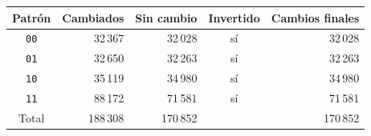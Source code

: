\begin{tabular}{crrcr}
\toprule
Patrón & Cambiados & Sin cambio & Invertido & Cambios finales \\
\midrule
\texttt{00} & 32\,367 & 32\,028 & sí & 32\,028 \\
\texttt{01} & 32\,650 & 32\,263 & sí & 32\,263 \\
\texttt{10} & 35\,119 & 34\,980 & sí & 34\,980 \\
\texttt{11} & 88\,172 & 71\,581 & sí & 71\,581 \\
\midrule
Total & 188\,308 & 170\,852 & & 170\,852 \\
\bottomrule
\end{tabular}
